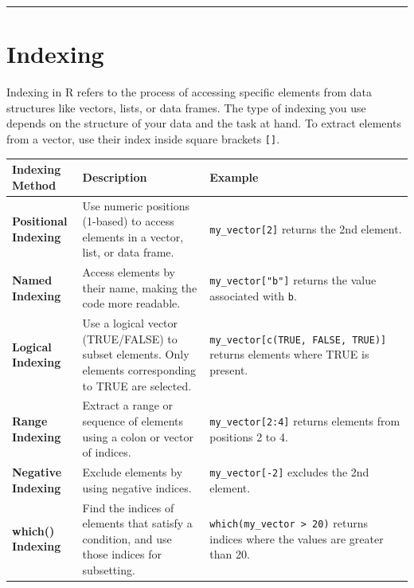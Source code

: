 \documentclass[
]{book}
\begin{document}
\begin{center}\rule{0.5\linewidth}{0.5pt}\end{center}

\section{Indexing}\label{index}

Indexing in R refers to the process of accessing specific elements from data structures like vectors, lists, or data frames. The type of indexing you use depends on the structure of your data and the task at hand. To extract elements from a vector, use their index inside square brackets \texttt{{[}{]}}.

\begin{longtable}[]{@{}
  >{\raggedright\arraybackslash}p{}
  >{\raggedright\arraybackslash}p{}
  >{\raggedright\arraybackslash}p{}@{}}
\toprule\noalign{}
\begin{minipage}[b]{\linewidth}\raggedright
\textbf{Indexing Method}
\end{minipage} & \begin{minipage}[b]{\linewidth}\raggedright
\textbf{Description}
\end{minipage} & \begin{minipage}[b]{\linewidth}\raggedright
\textbf{Example}
\end{minipage} \\
\midrule\noalign{}
\endhead
\bottomrule\noalign{}
\endlastfoot
\textbf{Positional Indexing} & Use numeric positions (1-based) to access elements in a vector, list, or data frame. & \texttt{my\_vector{[}2{]}} returns the 2nd element. \\
\textbf{Named Indexing} & Access elements by their name, making the code more readable. & \texttt{my\_vector{[}"b"{]}} returns the value associated with \texttt{b}. \\
\textbf{Logical Indexing} & Use a logical vector (TRUE/FALSE) to subset elements. Only elements corresponding to TRUE are selected. & \texttt{my\_vector{[}c(TRUE,\ FALSE,\ TRUE){]}} returns elements where TRUE is present. \\
\textbf{Range Indexing} & Extract a range or sequence of elements using a colon or vector of indices. & \texttt{my\_vector{[}2:4{]}} returns elements from positions 2 to 4. \\
\textbf{Negative Indexing} & Exclude elements by using negative indices. & \texttt{my\_vector{[}-2{]}} excludes the 2nd element. \\
\textbf{which() Indexing} & Find the indices of elements that satisfy a condition, and use those indices for subsetting. & \texttt{which(my\_vector\ \textgreater{}\ 20)} returns indices where the values are greater than 20. \\
\end{longtable}
\end{document}
